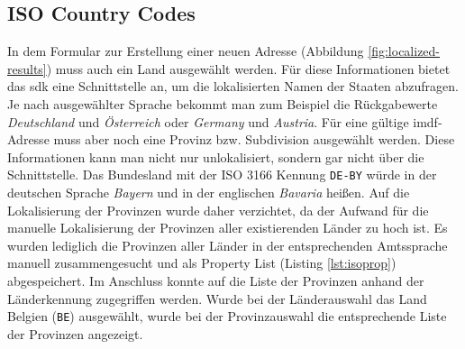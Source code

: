 \subsection{ISO Country Codes}
In dem Formular zur Erstellung einer neuen Adresse (Abbildung \ref{fig:localized-results}) muss auch ein Land ausgewählt werden.
Für diese Informationen bietet das \Gls{sdk} eine Schnittstelle an, um die lokalisierten Namen der Staaten abzufragen.
Je nach ausgewählter Sprache bekommt man zum Beispiel die Rückgabewerte \emph{Deutschland} und \emph{Österreich} oder \emph{Germany} und \emph{Austria}.
Für eine gültige \ac{imdf}-Adresse muss aber noch eine Provinz bzw. Subdivision ausgewählt werden.
Diese Informationen kann man nicht nur unlokalisiert, sondern gar nicht über die Schnittstelle.
Das Bundesland mit der ISO 3166 Kennung \texttt{DE-BY} würde in der deutschen Sprache \emph{Bayern} und in der englischen \emph{Bavaria} heißen.
Auf die Lokalisierung der Provinzen wurde daher verzichtet, da der Aufwand für die manuelle Lokalisierung der Provinzen aller existierenden Länder zu hoch ist.
Es wurden lediglich die Provinzen aller Länder in der entsprechenden Amtssprache manuell zusammengesucht und als Property List (Listing \ref{lst:isoprop}) abgespeichert.
Im Anschluss konnte auf die Liste der Provinzen anhand der Länderkennung zugegriffen werden.
Wurde bei der Länderauswahl das Land Belgien (\texttt{BE}) ausgewählt, wurde bei der Provinzauswahl die entsprechende Liste der Provinzen angezeigt.
